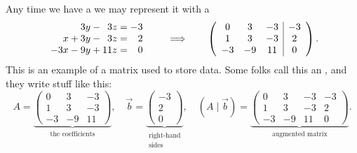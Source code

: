 \documentclass{ximera}
\begin{document}
Any time we have a  we may represent it with a
\[
  \begin{array}{r@{}c@{}r@{}c@{}r@{}c@{}r}
         &        & 3y  & {}-{}  & 3z   & {}={}  & -3 \\
    x    & {}+{}  & 3y  & {}-{}  & 3z   & {}={}  & 2 \\
    -3x  & {}-{}  & 9y  & {}+{}  & 11z  & {}={}  & 0
  \end{array}
  \qquad\Longrightarrow\qquad
  \left(
    \begin{array}{ccc|c}
      0 &   3 & -3 & -3 \\
      1 &   3 & -3 & 2  \\
      -3& -9  & 11 & 0
    \end{array}
  \right).
\]
This is an example of a matrix used to store data. Some folks call
this an , and they write stuff like this:
\[
  A = \underbrace{\left( \begin{array}{ccc}
    0 & 3 & -3  \\
    1 &  3  & -3 \\
    -3 & -9 & 11
  \end{array} \right)}_{\text{the coefficients}},
\quad
\vec{b} =
\underbrace{\left( \begin{array}{c}
  -3\\ 2 \\ 0
\end{array} \right)}_{\begin{smallmatrix}\text{right-hand} \\
  \text{sides} \end{smallmatrix}},
\quad
\left(A \mid \vec{b}\right) =
\underbrace{\left( \begin{array}{ccc|c}
  0 &   3 & -3 & -3 \\
  1 &   3 & -3 & 2  \\
  -3& -9  & 11 & 0
\end{array} \right)}_{\text{augmented matrix}}.
\]
\end{document}
